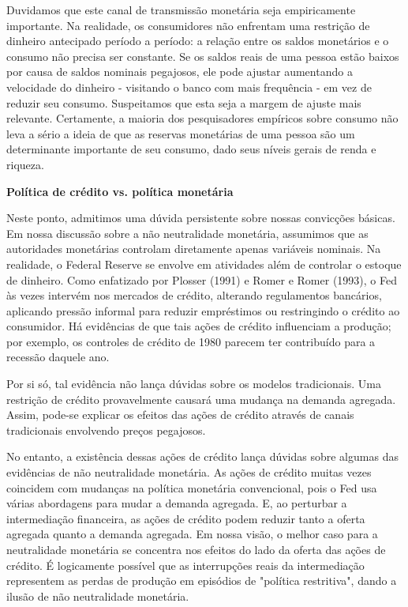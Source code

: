 \documentclass[a4paper,12pt]{article}[abntex2]
\begin{document}
Duvidamos que este canal de transmissão monetária seja empiricamente importante. Na realidade, os consumidores não enfrentam uma restrição de dinheiro antecipado período a período: a relação entre os saldos monetários e o consumo não precisa ser constante.
Se os saldos reais de uma pessoa estão baixos por causa de saldos nominais pegajosos, ele pode ajustar aumentando a velocidade do dinheiro - visitando o banco com mais frequência - em vez de reduzir seu consumo. Suspeitamos que esta seja a margem de ajuste mais relevante. Certamente, a maioria dos pesquisadores empíricos sobre consumo não leva a sério a ideia de que as reservas monetárias de uma pessoa são um determinante importante de seu consumo, dado seus níveis gerais de renda e riqueza.

\textbf{Política de crédito vs. política monetária}

Neste ponto, admitimos uma dúvida persistente sobre nossas convicções básicas. Em nossa discussão sobre a não neutralidade monetária, assumimos que as autoridades monetárias controlam diretamente apenas variáveis nominais. Na realidade, o Federal Reserve se envolve em atividades além de controlar o estoque de dinheiro. Como enfatizado por Plosser (1991) e Romer e Romer (1993), o Fed às vezes intervém nos mercados de crédito, alterando regulamentos bancários, aplicando pressão informal para reduzir empréstimos ou restringindo o crédito ao consumidor. Há evidências de que tais ações de crédito influenciam a produção; por exemplo, os controles de crédito de 1980 parecem ter contribuído para a recessão daquele ano.

Por si só, tal evidência não lança dúvidas sobre os modelos tradicionais. Uma restrição de crédito provavelmente causará uma mudança na demanda agregada. Assim, pode-se explicar os efeitos das ações de crédito através de canais tradicionais envolvendo preços pegajosos.

No entanto, a existência dessas ações de crédito lança dúvidas sobre algumas das evidências de não neutralidade monetária. As ações de crédito muitas vezes coincidem com mudanças na política monetária convencional, pois o Fed usa várias abordagens para mudar a demanda agregada. E, ao perturbar a intermediação financeira, as ações de crédito podem reduzir tanto a oferta agregada quanto a demanda agregada. Em nossa visão, o melhor caso para a neutralidade monetária se concentra nos efeitos do lado da oferta das ações de crédito. É logicamente possível que as interrupções reais da intermediação representem as perdas de produção em episódios de "política restritiva", dando a ilusão de não neutralidade monetária.
\end{document}

